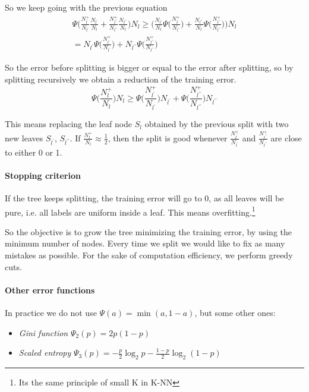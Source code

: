 So we keep going with the previous equation
\begin{equation}
    \begin{aligned}
        \Psi\bigg(\frac{N_{l^\prime}^+}{N_{l^\prime}}
    \frac{N_{l^\prime}}{N_l}+\frac{N_{l^{\prime\prime}}^+}{N_{l^{\prime\prime}}}
    \frac{N_{l^{\prime\prime}}}{N_l}
    \bigg)N_l \geq 
    \bigg(\frac{N_{l^\prime}}{N_l}\Psi\bigg(\frac{N_{l^\prime}^+}{N_{l^\prime}}
    \bigg) + \frac{N_{l^{\prime\prime}}}{N_l}\Psi\bigg(\frac{N_{l^{\prime\prime}}^+}{N_{l^{\prime\prime}}}\bigg)\bigg)N_l\\
    = N_{l^\prime}\Psi\bigg(\frac{N_{l^\prime}^+}{N_{l^\prime}}
    \bigg) + N_{l^{\prime\prime}}\Psi\bigg(\frac{N_{l^{\prime\prime}}^+}{N_{l^{\prime\prime}}}\bigg)
    \end{aligned}
\end{equation}

So the error before splitting is bigger or equal 
to the error after splitting, so by splitting recursively we 
obtain a reduction of the training error.
$$\Psi\bigg(\frac{N_l^+}{N_l}\bigg)N_l \geq 
\Psi\bigg(\frac{N_{l^\prime}^+}{N_{l^\prime}}
    \bigg)N_{l^\prime} + \Psi\bigg(\frac{N_{l^{\prime\prime}}^+}{N_{l^{\prime\prime}}}\bigg)N_{l^{\prime\prime}}$$

This means replacing the leaf node $S_l$ obtained by the previous split 
with two new leaves $S_{l^\prime}$, $S_{l^{\prime\prime}}$.
If $\frac{N_l^+}{N_l} \approx \frac{1}{2}$, then the split is good whenever 
$\frac{N_{l^\prime}^+}{N_{l^\prime}}$ and 
$\frac{N_{l^{\prime\prime}}^+}{N_{l^{\prime\prime}}}$ are close to either 0 or 1.

\paragraph{Stopping criterion}
If the tree keeps splitting, the training error will go to 0, as 
all leaves will be pure, i.e. all labels are uniform inside a leaf.
This means overfitting.\footnote{Its the same principle of small K in K-NN}

So the objective is to grow the tree minimizing the training error, by 
using the minimum number of nodes. Every time we split we would like 
to fix as many mistakes as possible. For the sake of computation efficiency, 
we perform greedy cuts.

\paragraph{Other error functions}
In practice we do not use $\Psi(a) = \min(a, 1-a)$, but some other ones:
\begin{itemize}
    \item \emph{Gini function} $\Psi_2(p) = 2p(1-p)$
    \item \emph{Scaled entropy} $\Psi_3(p) = -\frac{p}{2}\log_2 p - \frac{1-p}{2}\log_2(1-p)$
\end{itemize}

